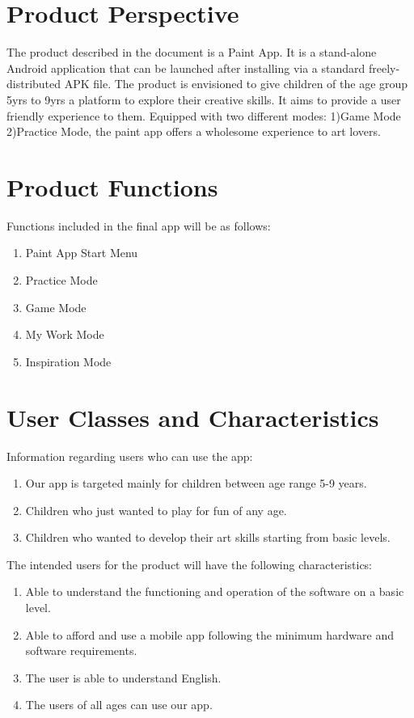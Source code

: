 \documentclass{scrreprt}
\begin{document}
\section{Product Perspective}
The product described in the document is a Paint App. It is a stand-alone Android application that can be launched after installing via a standard freely-distributed APK file.
The product is envisioned to give children of the age group 5yrs to 9yrs a platform to explore their creative skills. It aims to provide a user friendly experience to them. Equipped with two different modes: 1)Game Mode 2)Practice Mode, the paint app offers a wholesome experience to art lovers. 

\section{Product Functions}
Functions included in the final app will be as follows:
\begin{enumerate}[itemsep=0.5pt]
    \item Paint App Start Menu
    \item Practice Mode
    \item Game Mode
    \item My Work Mode
    \item Inspiration Mode
\end{enumerate}

\section{User Classes and Characteristics}
Information regarding users who can use the app:
    \begin{enumerate}[itemsep=0.5pt]
        \item Our app is targeted mainly for children between age range 5-9 years.
        \item Children who just wanted to play for fun of any age.
        \item Children who wanted to develop their art skills starting from basic levels. 
    \end{enumerate}
The intended users for the product will have the following characteristics:
    \begin{enumerate}[itemsep=0.5pt]
        \item Able to understand the functioning and operation of the software on a basic level.
        \item Able to afford and use a mobile app following the minimum hardware and software requirements.
        \item The user is able to understand English.
        \item The users of all ages can use our app.
    \end{enumerate}
\end{document}
